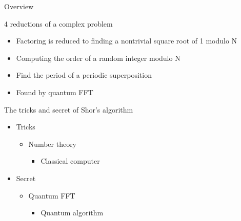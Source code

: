 \begin{frame}{Overview}

\begin{block}{4 reductions of a complex problem}

\begin{itemize}
\itemsep1pt\parskip0pt
\item
  Factoring is reduced to finding a nontrivial square root of 1 modulo N
\item
  Computing the order of a random integer modulo N
\item
  Find the period of a periodic superposition
\item
  Found by quantum FFT
\end{itemize}

\end{block}

\begin{block}{The tricks and secret of Shor's algorithm}

\begin{itemize}
\itemsep1pt\parskip0pt
\item
  Tricks

  \begin{itemize}
  \itemsep1pt\parskip0pt
  \item
    Number theory

    \begin{itemize}
    \itemsep1pt\parskip0pt
    \item
      Classical computer
    \end{itemize}
  \end{itemize}
\item
  Secret

  \begin{itemize}
  \itemsep1pt\parskip0pt
  \item
    Quantum FFT

    \begin{itemize}
    \itemsep1pt\parskip0pt
    \item
      Quantum algorithm
    \end{itemize}
  \end{itemize}
\end{itemize}

\end{block}

\end{frame}

